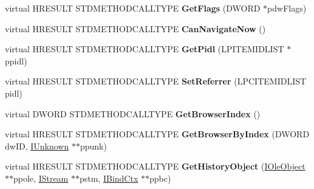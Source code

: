\begin{DoxyCompactItemize}
\item 
\mbox{\label{class_c_common_browser_a42f23c1f174c6341daa55b94c123ca56}} 
virtual H\+R\+E\+S\+U\+LT S\+T\+D\+M\+E\+T\+H\+O\+D\+C\+A\+L\+L\+T\+Y\+PE {\bfseries Get\+Flags} (D\+W\+O\+RD $\ast$pdw\+Flags)
\item 
\mbox{\label{class_c_common_browser_afe046847d624a69db23fd300a4b30969}} 
virtual H\+R\+E\+S\+U\+LT S\+T\+D\+M\+E\+T\+H\+O\+D\+C\+A\+L\+L\+T\+Y\+PE {\bfseries Can\+Navigate\+Now} ()
\item 
\mbox{\label{class_c_common_browser_a84a764c15d184f4012446ace859d1719}} 
virtual H\+R\+E\+S\+U\+LT S\+T\+D\+M\+E\+T\+H\+O\+D\+C\+A\+L\+L\+T\+Y\+PE {\bfseries Get\+Pidl} (L\+P\+I\+T\+E\+M\+I\+D\+L\+I\+ST $\ast$ppidl)
\item 
\mbox{\label{class_c_common_browser_a663332b4b6d601386b68a58842851e32}} 
virtual H\+R\+E\+S\+U\+LT S\+T\+D\+M\+E\+T\+H\+O\+D\+C\+A\+L\+L\+T\+Y\+PE {\bfseries Set\+Referrer} (L\+P\+C\+I\+T\+E\+M\+I\+D\+L\+I\+ST pidl)
\item 
\mbox{\label{class_c_common_browser_ac66414a2a07d25425db0a23549faff95}} 
virtual D\+W\+O\+RD S\+T\+D\+M\+E\+T\+H\+O\+D\+C\+A\+L\+L\+T\+Y\+PE {\bfseries Get\+Browser\+Index} ()
\item 
\mbox{\label{class_c_common_browser_a531cf43d52fafedb360b3b2016fb2cfc}} 
virtual H\+R\+E\+S\+U\+LT S\+T\+D\+M\+E\+T\+H\+O\+D\+C\+A\+L\+L\+T\+Y\+PE {\bfseries Get\+Browser\+By\+Index} (D\+W\+O\+RD dw\+ID, \hyperlink{interface_i_unknown}{I\+Unknown} $\ast$$\ast$ppunk)
\item 
\mbox{\label{class_c_common_browser_a19fd2146097ea3e0b4ca9d212ee2c3c4}} 
virtual H\+R\+E\+S\+U\+LT S\+T\+D\+M\+E\+T\+H\+O\+D\+C\+A\+L\+L\+T\+Y\+PE {\bfseries Get\+History\+Object} (\hyperlink{interface_i_ole_object}{I\+Ole\+Object} $\ast$$\ast$ppole, \hyperlink{interface_i_stream}{I\+Stream} $\ast$$\ast$pstm, \hyperlink{interface_i_bind_ctx}{I\+Bind\+Ctx} $\ast$$\ast$ppbc)
\item 
\mbox{\label{class_c_common_browser_a59a56cc4ef9e2e32746f2c9a023ff70f}} 

\end{DoxyCompactItemize}
